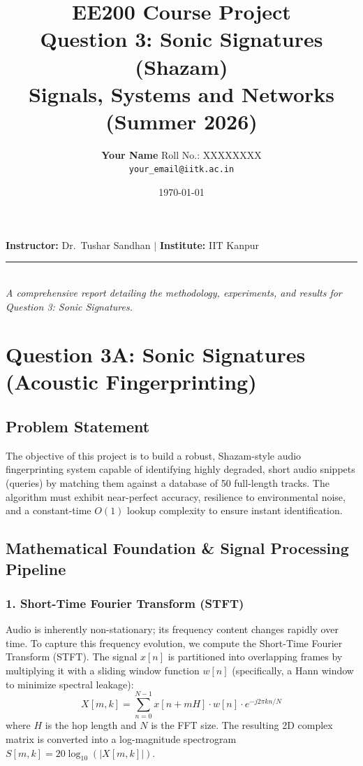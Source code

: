 \documentclass[12pt,a4paper]{article}
\title{
    \vspace{-1.5cm}
    {\Huge\sffamily\bfseries\color{iitkblue} EE200 Course Project}\\[0.6em]
    {\Large\color{highlight} Question 3: Sonic Signatures (Shazam)}\\[0.6em]
    {\Large\color{gray} Signals, Systems and Networks (Summer 2026)}
}
\author{\Large \textbf{Your Name} \quad Roll No.: XXXXXXXX \\ \texttt{your\_email@iitk.ac.in}}
\date{\today}
\begin{document}
\maketitle
\thispagestyle{empty}

\begin{center}
    \large \textbf{Instructor:} Dr.\ Tushar Sandhan \quad $\vert$ \quad \textbf{Institute:} IIT Kanpur \\[0.3em]
    \rule{0.8\textwidth}{0.5pt}\\[0.3em]
    \textit{A comprehensive report detailing the methodology, experiments, and results for Question 3: Sonic Signatures.}
\end{center}

\vspace{0.8cm}
\tableofcontents
\clearpage

\section{Question 3A: Sonic Signatures (Acoustic Fingerprinting)}

\subsection{Problem Statement}
The objective of this project is to build a robust, Shazam-style audio fingerprinting system capable of identifying highly degraded, short audio snippets (queries) by matching them against a database of 50 full-length tracks. The algorithm must exhibit near-perfect accuracy, resilience to environmental noise, and a constant-time $O(1)$ lookup complexity to ensure instant identification.

\subsection{Mathematical Foundation \& Signal Processing Pipeline}

\subsubsection{1. Short-Time Fourier Transform (STFT)}
Audio is inherently non-stationary; its frequency content changes rapidly over time. To capture this frequency evolution, we compute the Short-Time Fourier Transform (STFT). The signal $x[n]$ is partitioned into overlapping frames by multiplying it with a sliding window function $w[n]$ (specifically, a Hann window to minimize spectral leakage):
\begin{equation}
    X[m, k] = \sum_{n=0}^{N-1} x[n + mH] \cdot w[n] \cdot e^{-j2\pi k n / N}
\end{equation}
where $H$ is the hop length and $N$ is the FFT size. The resulting 2D complex matrix is converted into a log-magnitude spectrogram $S[m,k] = 20 \log_{10}(|X[m,k]|)$.
\end{document}
